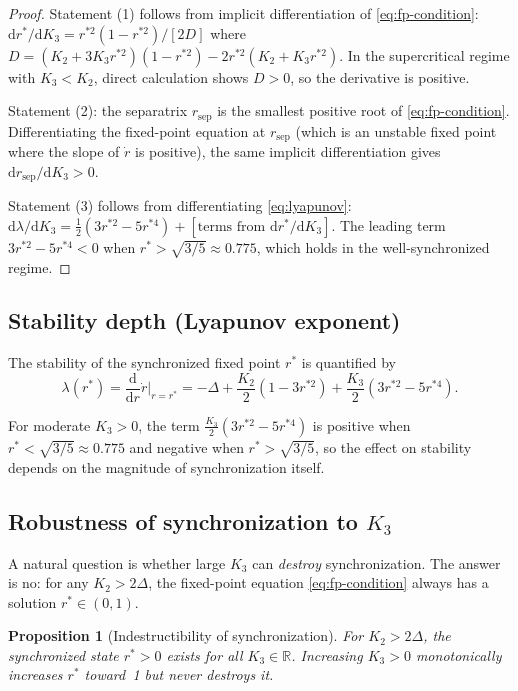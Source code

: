 \documentclass{article}
\newtheorem{proposition}{Proposition}
\newcommand{\Real}{\mathbb{R}}
\newcommand{\dd}{\mathrm{d}}
\begin{document}
\begin{proof}
  Statement (1) follows from implicit differentiation of \eqref{eq:fp-condition}:
  $\dd r^*/\dd K_3 = r^{*2}(1-r^{*2})/[2D]$ where
  $D=(K_2+3K_3r^{*2})(1-r^{*2})-2r^{*2}(K_2+K_3r^{*2})$.
  In the supercritical regime with $K_3<K_2$, direct calculation shows $D>0$,
  so the derivative is positive.

  Statement (2): the separatrix $r_{\mathrm{sep}}$ is the smallest positive
  root of \eqref{eq:fp-condition}.  Differentiating the fixed-point equation
  at $r_{\mathrm{sep}}$ (which is an unstable fixed point where the slope of
  $\dot{r}$ is positive), the same implicit differentiation gives
  $\dd r_{\mathrm{sep}}/\dd K_3>0$.

  Statement (3) follows from differentiating \eqref{eq:lyapunov}:
  $\dd\lambda/\dd K_3 = \frac{1}{2}(3r^{*2}-5r^{*4})
  + [\text{terms from } \dd r^*/\dd K_3]$.
  The leading term $3r^{*2}-5r^{*4}<0$ when $r^*>\sqrt{3/5}\approx 0.775$,
  which holds in the well-synchronized regime.
\end{proof}

\subsection{Stability depth (Lyapunov exponent)}

The stability of the synchronized fixed point $r^*$ is quantified by
\begin{equation}
  \lambda(r^*) = \frac{\dd}{\dd r}\dot{r}\Big|_{r=r^*}
  = -\Delta + \frac{K_2}{2}(1-3r^{*2}) + \frac{K_3}{2}(3r^{*2} - 5r^{*4}).
  \label{eq:lyapunov}
\end{equation}

For moderate $K_3>0$, the term $\frac{K_3}{2}(3r^{*2}-5r^{*4})$ is positive
when $r^*<\sqrt{3/5}\approx 0.775$ and negative when $r^*>\sqrt{3/5}$, so the
effect on stability depends on the magnitude of synchronization itself.

\subsection{Robustness of synchronization to $K_3$}
\label{sec:robustness}

A natural question is whether large $K_3$ can \emph{destroy} synchronization.
The answer is no: for any $K_2>2\Delta$, the fixed-point equation
\eqref{eq:fp-condition} always has a solution $r^*\in(0,1)$.

\begin{proposition}[Indestructibility of synchronization]
\label{prop:indestructible}
  For $K_2>2\Delta$, the synchronized state $r^*>0$ exists for all
  $K_3\in\Real$.  Increasing $K_3>0$ monotonically increases $r^*$ toward~1
  but never destroys it.
\end{proposition}
\end{document}
